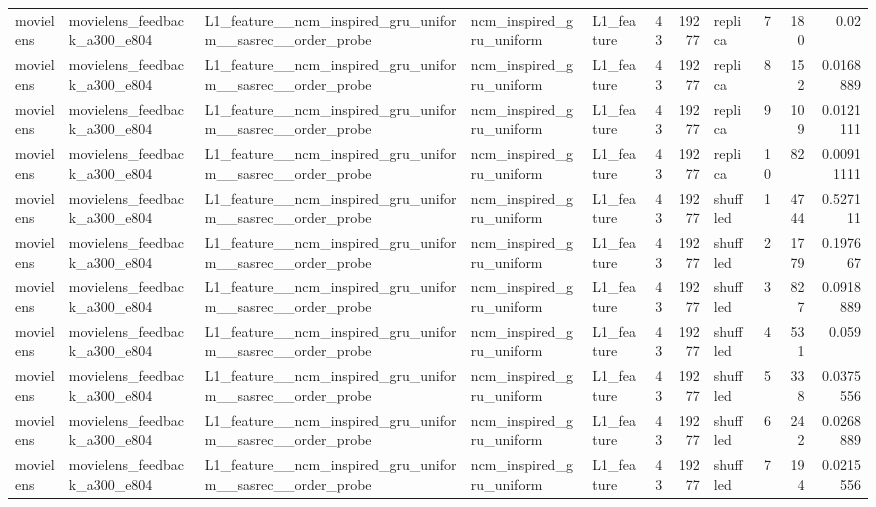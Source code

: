 \begin{table}[htbp!]
\begin{tabular}{lllllrrlrrr}
movielens & movielens\_feedback\_a300\_e804 & L1\_feature\_\_ncm\_inspired\_gru\_uniform\_\_sasrec\_\_order\_probe & ncm\_inspired\_gru\_uniform & L1\_feature & 43 & 19277 & replica & 7 & 180 & 0.02 \\
movielens & movielens\_feedback\_a300\_e804 & L1\_feature\_\_ncm\_inspired\_gru\_uniform\_\_sasrec\_\_order\_probe & ncm\_inspired\_gru\_uniform & L1\_feature & 43 & 19277 & replica & 8 & 152 & 0.0168889 \\
movielens & movielens\_feedback\_a300\_e804 & L1\_feature\_\_ncm\_inspired\_gru\_uniform\_\_sasrec\_\_order\_probe & ncm\_inspired\_gru\_uniform & L1\_feature & 43 & 19277 & replica & 9 & 109 & 0.0121111 \\
movielens & movielens\_feedback\_a300\_e804 & L1\_feature\_\_ncm\_inspired\_gru\_uniform\_\_sasrec\_\_order\_probe & ncm\_inspired\_gru\_uniform & L1\_feature & 43 & 19277 & replica & 10 & 82 & 0.00911111 \\
movielens & movielens\_feedback\_a300\_e804 & L1\_feature\_\_ncm\_inspired\_gru\_uniform\_\_sasrec\_\_order\_probe & ncm\_inspired\_gru\_uniform & L1\_feature & 43 & 19277 & shuffled & 1 & 4744 & 0.527111 \\
movielens & movielens\_feedback\_a300\_e804 & L1\_feature\_\_ncm\_inspired\_gru\_uniform\_\_sasrec\_\_order\_probe & ncm\_inspired\_gru\_uniform & L1\_feature & 43 & 19277 & shuffled & 2 & 1779 & 0.197667 \\
movielens & movielens\_feedback\_a300\_e804 & L1\_feature\_\_ncm\_inspired\_gru\_uniform\_\_sasrec\_\_order\_probe & ncm\_inspired\_gru\_uniform & L1\_feature & 43 & 19277 & shuffled & 3 & 827 & 0.0918889 \\
movielens & movielens\_feedback\_a300\_e804 & L1\_feature\_\_ncm\_inspired\_gru\_uniform\_\_sasrec\_\_order\_probe & ncm\_inspired\_gru\_uniform & L1\_feature & 43 & 19277 & shuffled & 4 & 531 & 0.059 \\
movielens & movielens\_feedback\_a300\_e804 & L1\_feature\_\_ncm\_inspired\_gru\_uniform\_\_sasrec\_\_order\_probe & ncm\_inspired\_gru\_uniform & L1\_feature & 43 & 19277 & shuffled & 5 & 338 & 0.0375556 \\
movielens & movielens\_feedback\_a300\_e804 & L1\_feature\_\_ncm\_inspired\_gru\_uniform\_\_sasrec\_\_order\_probe & ncm\_inspired\_gru\_uniform & L1\_feature & 43 & 19277 & shuffled & 6 & 242 & 0.0268889 \\
movielens & movielens\_feedback\_a300\_e804 & L1\_feature\_\_ncm\_inspired\_gru\_uniform\_\_sasrec\_\_order\_probe & ncm\_inspired\_gru\_uniform & L1\_feature & 43 & 19277 & shuffled & 7 & 194 & 0.0215556 \\

\end{tabular}
\end{table}
